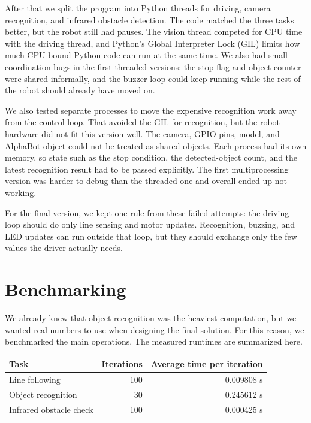 \documentclass{article}
\begin{document}
After that we split the program into Python threads for driving, camera recognition, and infrared obstacle detection. The code matched the three tasks better, but the robot still had pauses. The vision thread competed for CPU time with the driving thread, and Python's Global Interpreter Lock (GIL) limits how much CPU-bound Python code can run at the same time. We also had small coordination bugs in the first threaded versions: the stop flag and object counter were shared informally, and the buzzer loop could keep running while the rest of the robot should already have moved on.

We also tested separate processes to move the expensive recognition work away from the control loop. That avoided the GIL for recognition, but the robot hardware did not fit this version well. The camera, GPIO pins, model, and AlphaBot object could not be treated as shared objects. Each process had its own memory, so state such as the stop condition, the detected-object count, and the latest recognition result had to be passed explicitly. The first multiprocessing version was harder to debug than the threaded one and overall ended up not working.

For the final version, we kept one rule from these failed attempts: the driving loop should do only line sensing and motor updates. Recognition, buzzing, and LED updates can run outside that loop, but they should exchange only the few values the driver actually needs.

\section{Benchmarking}

We already knew that object recognition was the heaviest computation, but we wanted real numbers to use when designing the final solution. For this reason, we benchmarked the main operations.
The measured runtimes are summarized here.

\begin{center}
\begin{tabular}{lrr}
\hline
Task & Iterations & Average time per iteration \\
\hline
Line following & 100 & 0.009808 s \\
Object recognition & 30 & 0.245612 s \\
Infrared obstacle check & 100 & 0.000425 s \\
\hline
\end{tabular}
\end{center}
\end{document}
